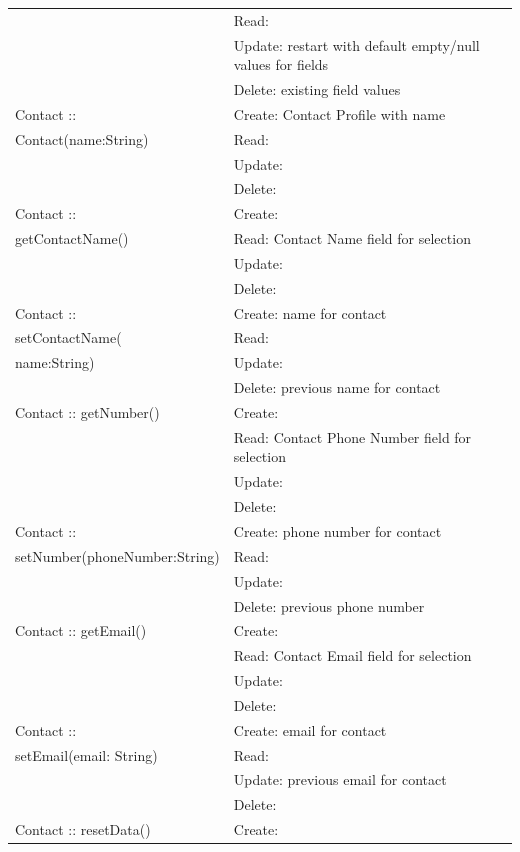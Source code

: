 \begin{longtable}{|p{.3\linewidth}|p{.7\linewidth}|}
                & Read: \\
               & Update: restart with default empty/null values for fields\\
               & Delete: existing field values\\ \hline
    Contact :: & Create: Contact Profile with name  \\
    Contact(name:String) & Read: \\
               & Update: \\
               & Delete: \\ \hline
    Contact :: & Create:  \\
    getContactName() & Read: Contact Name field for selection\\
               & Update: \\
               & Delete: \\ \hline
    Contact :: & Create: name for contact \\
    setContactName( & Read: \\
    name:String) & Update: \\
               & Delete: previous name for contact \\ \hline
    Contact :: getNumber() & Create:  \\
                & Read: Contact Phone Number field for selection\\
               & Update: \\
               & Delete: \\ \hline
    Contact :: & Create: phone number for contact \\
    setNumber(phoneNumber:String) & Read: \\
               & Update: \\
               & Delete: previous phone number \\ \hline
    Contact :: getEmail() & Create:  \\
                & Read: Contact Email field for selection\\
               & Update: \\
               & Delete: \\ \hline
    Contact :: & Create: email for contact \\
    setEmail(email: String) & Read: \\
               & Update: previous email for contact\\
               & Delete: \\ \hline
    Contact :: resetData() & Create:  \\

\end{longtable}
